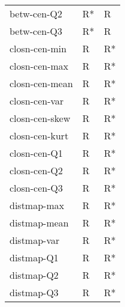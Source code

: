 \documentclass{report}
\begin{document}
\begin{longtable}{lll}
	betw-cen-Q2                   &     R* &    R \\
	betw-cen-Q3                   &     R* &    R \\
	closn-cen-min                 &      R &   R* \\
	closn-cen-max                 &      R &   R* \\
	closn-cen-mean                &      R &   R* \\
	closn-cen-var                 &      R &   R* \\
	closn-cen-skew                &      R &   R* \\
	closn-cen-kurt                &      R &   R* \\
	closn-cen-Q1                  &      R &   R* \\
	closn-cen-Q2                  &      R &   R* \\
	closn-cen-Q3                  &      R &   R* \\
	distmap-max                   &      R &   R* \\
	distmap-mean                  &      R &   R* \\
	distmap-var                   &      R &   R* \\
	distmap-Q1                    &      R &   R* \\
	distmap-Q2                    &      R &   R* \\
	distmap-Q3                    &      R &   R* \\
\end{longtable}
\end{document}
